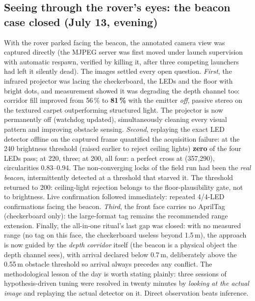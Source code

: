 \subsection{Seeing through the rover's eyes: the beacon case closed
(July 13, evening)}
\label{sec:beacon-closed}
With the rover parked facing the beacon, the annotated camera view was
captured directly (the MJPEG server was first moved under launch
supervision with automatic respawn, verified by killing it, after
three competing launchers had left it silently dead). The images settled
every open question. \emph{First}, the infrared projector was lacing the
checkerboard, the LEDs and the floor with bright dots, and measurement
showed it was degrading the depth channel too: corridor fill improved from
56\,\% to \textbf{81\,\%} with the emitter \emph{off}, passive stereo
on the textured carpet outperforming structured light. The projector is now
permanently off (watchdog updated), simultaneously cleaning every visual
pattern and improving obstacle sensing. \emph{Second}, replaying the exact
LED detector offline on the captured frame quantified the acquisition
failure: at the 240 brightness threshold (raised earlier to reject ceiling
lights) \textbf{zero} of the four LEDs pass; at 220, three; at 200, all
four: a perfect cross at (357,290), circularities 0.83--0.94. The
non-converging locks of the field run had been the \emph{real beacon},
intermittently detected at a threshold that starved it. The threshold
returned to 200: ceiling-light rejection belongs to the floor-plausibility
gate, not to brightness. Live confirmation followed immediately: repeated
4/4-LED confirmations facing the beacon. \emph{Third}, the front face
carries no AprilTag (checkerboard only): the large-format tag remains
the recommended range extension. Finally, the all-in-one ritual's
last gap was closed: with no measured range (no tag on this face, the
checkerboard useless beyond 1.5\,m), the approach is now guided by the
\emph{depth corridor} itself (the beacon is a physical object the depth
channel sees), with arrival declared below 0.7\,m, deliberately above
the 0.55\,m obstacle threshold so arrival always precedes any conflict.
The methodological lesson of the day is worth stating plainly: three
sessions of hypothesis-driven tuning were resolved in twenty minutes by
\emph{looking at the actual image} and replaying the actual detector on
it. Direct observation beats inference.


